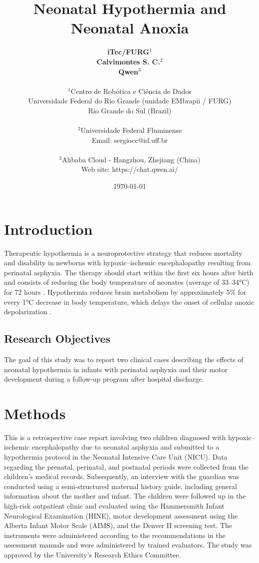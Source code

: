 \documentclass[11pt,a4paper]{article}
\title{\textbf{Neonatal Hypothermia and Neonatal Anoxia}}
\author{
	\textbf{iTec/FURG}$^{1}$ \\
	\textbf{Calvimontes S. C.}$^{2}$ \\
	\textbf{Qwen}$^{3}$ \\
	\\
	\small $^{1}$Centro de Robótica e Ciência de Dados \\
	\small Universidade Federal do Rio Grande (unidade EMbrapii / FURG) \\
	\small Rio Grande do Sul (Brazil) \\
	\\
	\small $^{2}$Universidade Federal Fluminense \\
	\small Email: sergiocc@id.uff.br \\
	\\
	\small $^{3}$Alibaba Cloud - Hangzhou, Zhejiang (China) \\
	\small Web site: https://chat.qwen.ai/
}
\date{\today}
\begin{document}
	
	\maketitle
	
	\newpage
	
	\section{Introduction}
	Therapeutic hypothermia is a neuroprotective strategy that reduces mortality and disability in newborns with hypoxic–ischemic encephalopathy resulting from perinatal asphyxia. The therapy should start within the first six hours after birth and consists of reducing the body temperature of neonates (average of 33–34°C) for 72 hours \cite{Azzopardi2014,Laptook2017,Thayyil2021}. Hypothermia reduces brain metabolism by approximately 5\% for every 1°C decrease in body temperature, which delays the onset of cellular anoxic depolarization \cite{Silveira2015}.
		
	\subsection{Research Objectives}
	The goal of this study was to report two clinical cases describing the effects of neonatal hypothermia in infants with perinatal asphyxia and their motor development during a follow-up program after hospital discharge.
	
	\section{Methods}
	This is a retrospective case report involving two children diagnosed with hypoxic–ischemic encephalopathy due to neonatal asphyxia and submitted to a hypothermia protocol in the Neonatal Intensive Care Unit (NICU). Data regarding the prenatal, perinatal, and postnatal periods were collected from the children's medical records. Subsequently, an interview with the guardian was conducted using a semi-structured maternal history guide, including general information about the mother and infant. The children were followed up in the high-risk outpatient clinic and evaluated using the Hammersmith Infant Neurological Examination (HINE), motor development assessment using the Alberta Infant Motor Scale (AIMS), and the Denver II screening test. The instruments were administered according to the recommendations in the assessment manuals and were administered by trained evaluators. The study was approved by the University's Research Ethics Committee.
	
\end{document}
